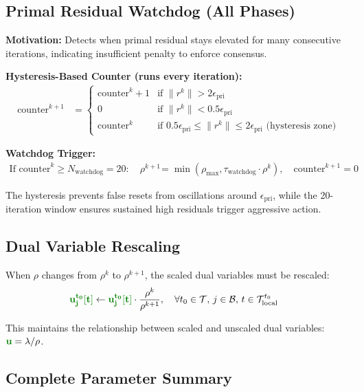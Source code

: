\documentclass[11pt]{article}
\newcommand{\greenu}[1]{\textcolor{greenvar}{\mathbf{#1}}}    %
\begin{document}
\subsection{Primal Residual Watchdog (All Phases)}

\textbf{Motivation:} Detects when primal residual stays elevated for many consecutive iterations, indicating insufficient penalty to enforce consensus.

\textbf{Hysteresis-Based Counter (runs every iteration):}
\begin{align}
\text{counter}^{k+1} &= \begin{cases}
\text{counter}^k + 1 & \text{if } \|r^k\| > 2\epsilon_{\text{pri}} \\
0 & \text{if } \|r^k\| < 0.5\epsilon_{\text{pri}} \\
\text{counter}^k & \text{if } 0.5\epsilon_{\text{pri}} \leq \|r^k\| \leq 2\epsilon_{\text{pri}} \text{ (hysteresis zone)}
\end{cases}
\end{align}

\textbf{Watchdog Trigger:}
\begin{align}
\text{If counter}^k \geq N_{\text{watchdog}} = 20: \quad \rho^{k+1} &= \min(\rho_{\max}, \tau_{\text{watchdog}} \cdot \rho^k), \quad \text{counter}^{k+1} = 0
\end{align}

The hysteresis prevents false resets from oscillations around $\epsilon_{\text{pri}}$, while the 20-iteration window ensures sustained high residuals trigger aggressive action.

\subsection{Dual Variable Rescaling}

When $\rho$ changes from $\rho^k$ to $\rho^{k+1}$, the scaled dual variables must be rescaled:
\begin{align}
\greenu{u_j^{t_0}[t]} &\leftarrow \greenu{u_j^{t_0}[t]} \cdot \frac{\rho^k}{\rho^{k+1}}, \quad \forall t_0 \in \mathcal{T}, \, j \in \mathcal{B}, \, t \in \mathcal{T}_{\text{local}}^{t_0}
\end{align}

This maintains the relationship between scaled and unscaled dual variables: $\greenu{u} = \lambda / \rho$.

\subsection{Complete Parameter Summary}
\end{document}
